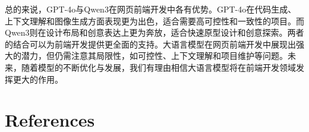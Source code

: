 \documentclass[12pt]{article}
\begin{document}
总的来说，GPT-4o与Qwen3在网页前端开发中各有优势。GPT-4o在代码生成、上下文理解和图像生成方面表现更为出色，适合需要高可控性和一致性的项目。而Qwen3则在设计布局和创意表达上更为奔放，适合快速原型设计和创意探索。两者的结合可以为前端开发提供更全面的支持。大语言模型在网页前端开发中展现出强大的潜力，但仍需注意其局限性，如可控性、上下文理解和项目维护等问题。未来，随着模型的不断优化与发展，我们有理由相信大语言模型将在前端开发领域发挥更大的作用。
\section*{\centering References}




\end{document}
